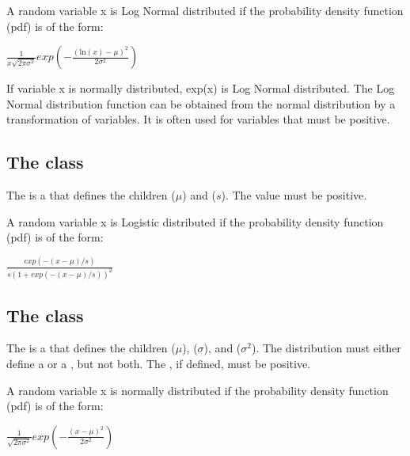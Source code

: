 A random variable x is Log Normal distributed if the probability density function (pdf) is of the form:

\begin{center}
$\frac{1}{x \sqrt{2 \pi \sigma^2}} exp(-\frac{ (\mathrm{ln}(x)-\mu)^2 }{2 \sigma^2})$
\end{center}

If variable x is normally distributed, exp(x) is Log Normal distributed. The Log Normal distribution function can be obtained from the normal distribution by a transformation of variables. It is often used for variables that must be positive.

\subsection{The  class}
\label{LogisticDistribution-class}
\label{logisticdistribution-class}

The \LogisticDistribution is a \ContinuousUnivariateDistribution that defines the \UncertValue children  ($\mu$) and  ($s$).  The  value must be positive.

A random variable x is Logistic distributed if the probability density function (pdf) is of the form:

\begin{center}
$\frac{exp(-(x-\mu)/s)}{s(1+exp(-(x-\mu)/s))^2}$
\end{center}

\subsection{The  class}
\label{NormalDistribution-class}
\label{normaldistribution-class}

The \NormalDistribution is a \ContinuousUnivariateDistribution that defines the \UncertValue children  ($\mu$),  ($\sigma$), and  ($\sigma^2$).  The distribution must either define a  or a , but not both.  The , if defined, must be positive.

A random variable x is normally distributed if the probability density function (pdf) is of the form:

\begin{center}
$\frac{1}{\sqrt{2\pi\sigma^2}}exp(-\frac{(x-\mu)^2}{2\sigma^2})$
\end{center}

